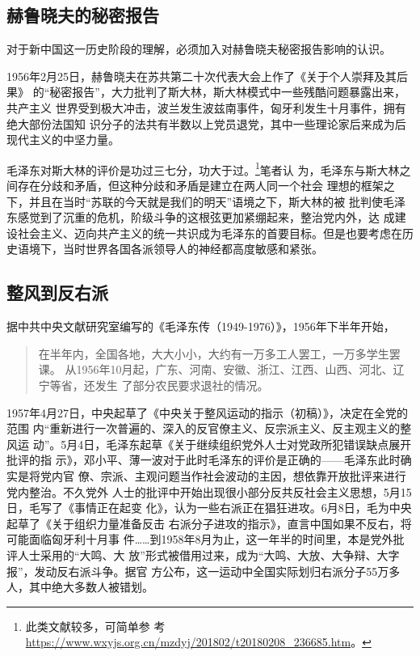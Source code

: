 \subsection{赫鲁晓夫的秘密报告}

对于新中国这一历史阶段的理解，必须加入对赫鲁晓夫秘密报告影响的认识。

1956年2月25日，赫鲁晓夫在苏共第二十次代表大会上作了《关于个人崇拜及其后果》
的“秘密报告”，大力批判了斯大林，斯大林模式中一些残酷问题暴露出来，共产主义
世界受到极大冲击，波兰发生波兹南事件，匈牙利发生十月事件，拥有绝大部份法国知
识分子的法共有半数以上党员退党，其中一些理论家后来成为后现代主义的中坚力量。

毛泽东对斯大林的评价是功过三七分，功大于过。\footnote{此类文献较多，可简单参
  考\url{https://www.wxyjs.org.cn/mzdyj/201802/t20180208_236685.htm}。}笔者认
为，毛泽东与斯大林之间存在分歧和矛盾，但这种分歧和矛盾是建立在两人同一个社会
理想的框架之下，并且在当时“苏联的今天就是我们的明天”语境之下，斯大林的被
批判使毛泽东感觉到了沉重的危机，阶级斗争的这根弦更加紧绷起来，整治党内外，达
成建设社会主义、迈向共产主义的统一共识成为毛泽东的首要目标。但是也要考虑在历
史语境下，当时世界各国各派领导人的神经都高度敏感和紧张。

\subsection{整风到反右派}

据中共中央文献研究室编写的《毛泽东传（1949-1976）》，1956年下半年开始，
\begin{quotation}
  在半年内，全国各地，大大小小，大约有一万多工人罢工，一万多学生罢课。
  从1956年10月起，广东、河南、安徽、浙江、江西、山西、河北、辽宁等省，还发生
  了部分农民要求退社的情况。
\end{quotation}

1957年4月27日，中央起草了《中央关于整风运动的指示（初稿）》，决定在全党的范围
内“重新进行一次普遍的、深入的反官僚主义、反宗派主义、反主观主义的整风运
动”。5月4日，毛泽东起草《关于继续组织党外人士对党政所犯错误缺点展开批评的指
示》，邓小平、薄一波对于此时毛泽东的评价是正确的——毛泽东此时确实是将党内官
僚、宗派、主观问题当作社会波动的主因，想依靠开放批评来进行党内整治。不久党外
人士的批评中开始出现很小部分反共反社会主义思想，5月15日，毛写了《事情正在起变
化》，认为一些右派正在猖狂进攻。6月8日，毛为中央起草了《关于组织力量准备反击
右派分子进攻的指示》，直言中国如果不反右，将可能面临匈牙利十月事
件……到1958年8月为止，这一年半的时间里，本是党外批评人士采用的“大鸣、大
放”形式被借用过来，成为“大鸣、大放、大争辩、大字报”，发动反右派斗争。据官
方公布，这一运动中全国实际划归右派分子55万多人，其中绝大多数人被错划。

